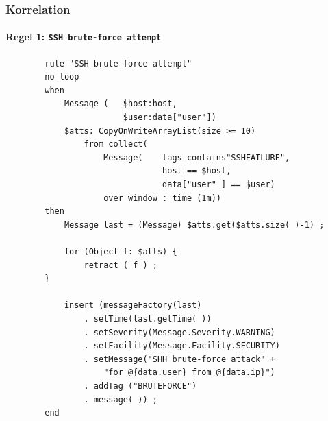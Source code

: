 \begin{frame}[fragile]
\frametitle{Korrelation}
\framesubtitle{Regel 1: \texttt{SSH brute-force attempt}}

\begin{center}
    \begin{minipage}{0.7\textwidth}
        \begin{verbatim}
        rule "SSH brute-force attempt"
        no-loop
        when
            Message (   $host:host,
                        $user:data["user"])
            $atts: CopyOnWriteArrayList(size >= 10)
                from collect(
                    Message(    tags contains"SSHFAILURE",
                                host == $host,
                                data["user" ] == $user)
                    over window : time (1m))
        then
            Message last = (Message) $atts.get($atts.size( )-1) ;
        
            for (Object f: $atts) {
                retract ( f ) ;
        }
        
            insert (messageFactory(last)
                . setTime(last.getTime( ))
                . setSeverity(Message.Severity.WARNING)
                . setFacility(Message.Facility.SECURITY)
                . setMessage("SHH brute-force attack" +
                    "for @{data.user} from @{data.ip}")
                . addTag ("BRUTEFORCE")
                . message( )) ;
        end        
        
        \end{verbatim}
    \end{minipage}
\end{center}

\end{frame}

